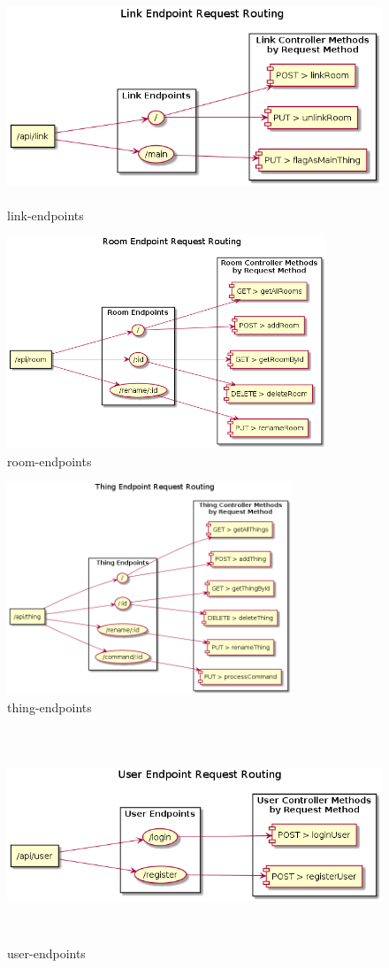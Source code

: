 \begin{figure}[hbt!]
\centering
\includegraphics[height=2.5in]{figures/diagrams/back/router-flow/link-endpoints.png}
\caption[link-endpoints]{link-endpoints\footnotemark}
\end{figure}

\begin{figure}[hbt!]
\centering
\includegraphics[height=2.5in]{figures/diagrams/back/router-flow/room-endpoints.png}
\caption[room-endpoints]{room-endpoints\footnotemark}
\end{figure}

\begin{figure}[hbt!]
\centering
\includegraphics[height=2.5in]{figures/diagrams/back/router-flow/thing-endpoints.png}
\caption[thing-endpoints]{thing-endpoints\footnotemark}
\end{figure}

\begin{figure}[hbt!]
\centering
\includegraphics[height=2.5in]{figures/diagrams/back/router-flow/user-endpoints.png}
\caption[user-endpoints]{user-endpoints\footnotemark}
\end{figure}